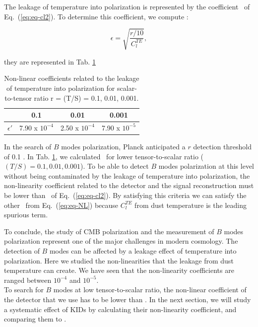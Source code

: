 The leakage of temperature into polarization is represented by the coefficient \eps\ of Eq.~(\ref{eq:eq-cl2}). To determine this coefficient, we compute :

\begin{equation}
\epsilon = \sqrt{\dfrac{r/10}{C_{l}^{TE}}},
\label{eq:eq-cl3}
\end{equation}

they are represented in Tab. \ref{tab:eps-lkg}

\begin{table}[h!]
\center
	\begin{tabular}{|c|c|c|c|}
  	\hline
 	\backslashbox{$\epsilon$}{$r$} & 0.1 & 0.01 & 0.001 \\
	\hline
	$\epsilon'$ & 7.90 x $10^{-4}$ & 2.50 x $10^{-4}$ & 7.90 x $10^{-5}$\\
  	\hline
	\end{tabular} 
\caption{Non-linear coefficients related to the leakage of temperature into polarization for scalar-to-tensor ratio r = (T/S) = 0.1, 0.01, 0.001.}
\label{tab:eps-lkg}
\end{table}

In the search of $B$ modes polarization, Planck anticipated a $r$ detection threshold of 0.1 . In Tab. \ref{tab:eps-lkg}, we calculated \eps\ for lower tensor-to-scalar ratio ($(T/S) = 0.1, 0.01, 0.001$). To be able to detect $B$ modes polarization at this level without being contaminated by the leakage of temperature into polarization, the non-linearity coefficient related to the detector and the signal reconstruction must be lower than \eps\ of Eq.~(\ref{eq:eq-cl2}). By satisfying this criteria we can satisfy the other \eps\ from Eq.~(\ref{eq:eq-NL}) because $C_{l}^{TE}$ from dust temperature is the leading spurious term. 

To conclude, the study of CMB polarization and the measurement of $B$ modes polarization represent one of the major challenges in modern cosmology. The detection of $B$ modes can be affected by a leakage effect of temperature into polarization. Here we studied the non-linearities that the leakage from dust temperature can create. We have seen that the non-linearity coefficients are ranged between $10^{-4}$ and $10^{-5}$.\\

To search for $B$ modes at low tensor-to-scalar ratio, the non-linear coefficient of the detector that we use has to be lower than \eps . In the next section, we will study a systematic effect of KIDs by calculating their non-linearity coefficient, and comparing them to \eps .
